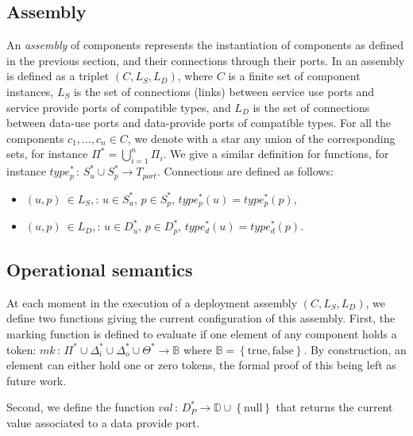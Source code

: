 \subsection{Assembly}

An \emph{assembly} of components represents the instantiation of
components as defined in the previous section, and their connections
through their ports. In \mad an assembly is defined as a triplet
$(C, L_S, L_D)$, where $C$ is a finite set of component instances,
$L_S$ is the set of connections (links) between service use ports and
service provide ports of compatible types, and $L_D$ is the set of
connections between data-use ports and data-provide ports of
compatible types. For all the components $c_1,\dots,c_n \in C$, we
denote with a star any union of the corresponding sets, for instance
$\Pi^*=\bigcup_{i=1}^{n}\Pi_{i}$. We give a similar definition
for functions, for instance
$type_{p}^*\,:\,S_{u}^*\cup S_{p}^*\rightarrow T_{port}$. Connections
are defined as follows:

\begin{itemize}
\item $\left(u,p\right)\ \in L_S,:\,u\in S_{u}^{*},\,p\in S_{p}^{*},\,type_{p}^{*}\left(u\right)=type_{p}^{*}\left(p\right)$,
\item $\left(u,p\right)\ \in L_D,:\,u\in D_{u}^{*},\,p\in D_{p}^{*},\,type_{d}^{*}\left(u\right)=type_{d}^{*}\left(p\right)$.
\end{itemize}

\subsection{Operational semantics}
\label{subsec:operational_semantics}

At each moment in the execution of a \mad deployment assembly
$(C, L_S, L_D)$, we define two functions giving the current
configuration of this assembly. First, the marking function is defined
to evaluate if one element of any component holds a token:
$mk\,:\,\Pi^{*}\cup\Delta_{i}^{*}\cup\Delta_{o}^{*}\cup\Theta^{*}\rightarrow\mathbb{B}$
where $\mathbb{B}=\left\{ \text{true},\text{false}\right\}$. By
construction, an element can either hold one or zero tokens, the
formal proof of this being left as future work.

Second, we define the function
$val\,:\,D_{P}^{*}\rightarrow \mathbb{D}\cup\left\{ \text{null}\right\}$
that returns the current value associated to a data provide port.

